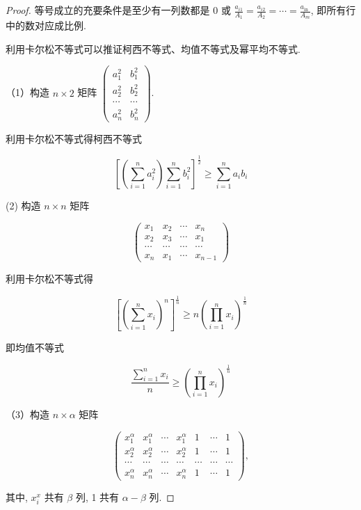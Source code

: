 \begin{proof}
	等号成立的充要条件是至少有一列数都是 0 或 $\frac{a_{i 1}}{A_{1}}=\frac{a_{i 2}}{A_{2}}=\cdots=\frac{a_{\text {in }}}{A_{m}}$, 即所有行中的数对应成比例.
	
	利用卡尔松不等式可以推证柯西不等式、均值不等式及幂平均不等式.
	
	（1）构造 $n \times 2$ 矩阵 $\left(\begin{array}{cc}a_{1}^{2} & b_{1}^{2} \\ a_{2}^{2} & b_{2}^{2} \\ \cdots & \cdots \\ a_{n}^{2} & b_{n}^{2}\end{array}\right)$.
	
	利用卡尔松不等式得柯西不等式
	
	$$
	\left[\left(\sum_{i=1}^{n} a_{i}^{2}\right) \sum_{i=1}^{n} b_{i}^{2}\right]^{\frac{1}{2}} \geqslant \sum_{i=1}^{n} a_{i} b_{i}
	$$
	
	(2) 构造 $n \times n$ 矩阵
	
	$$
	\left(\begin{array}{cccc}
	x_{1} & x_{2} & \cdots & x_{n} \\
	x_{2} & x_{3} & \cdots & x_{1} \\
	\cdots & \cdots & \cdots & \cdots \\
	x_{n} & x_{1} & \cdots & x_{n-1}
	\end{array}\right)
	$$
	
	利用卡尔松不等式得
	
	$$
	\left[\left(\sum_{i=1}^{n} x_{i}\right)^{n}\right]^{\frac{1}{n}} \geqslant n\left(\prod_{i=1}^{n} x_{i}\right)^{\frac{1}{n}}
	$$
	
	即均值不等式
	
	$$
	\frac{\sum_{i=1}^{n} x_{i}}{n} \geqslant\left(\prod_{i=1}^{n} x_{i}\right)^{\frac{1}{n}}
	$$
	
	（3）构造 $n \times \alpha$ 矩阵
	
	$$
	\left(\begin{array}{ccccccc}
	x_{1}^{\alpha} & x_{1}^{\alpha} & \cdots & x_{1}^{\alpha} & 1 & \cdots & 1 \\
	x_{2}^{\alpha} & x_{2}^{\alpha} & \cdots & x_{2}^{\alpha} & 1 & \cdots & 1 \\
	\cdots & \cdots & \cdots & \cdots & \cdots & \cdots & \cdots \\
	x_{n}^{\alpha} & x_{n}^{\alpha} & \cdots & x_{n}^{\alpha} & 1 & \cdots & 1
	\end{array}\right),
	$$
	
	其中, $x_{i}^{x}$ 共有 $\beta$ 列, 1 共有 $\alpha-\beta$ 列.
	

\end{proof}

